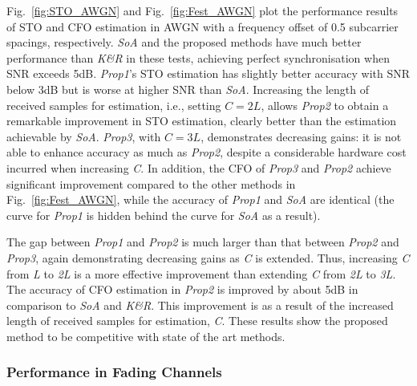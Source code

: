Fig.~\ref{fig:STO_AWGN} and  Fig.~\ref{fig:Fest_AWGN} plot the performance results of STO and CFO estimation in AWGN with a frequency offset of 0.5 subcarrier spacings, respectively.
\textit{SoA} and the proposed methods have much better performance than \textit{K\&R} in these tests, achieving perfect synchronisation when SNR exceeds 5{\thinspace}dB.
\textit{Prop1}'s STO estimation has slightly better accuracy with SNR below 3{\thinspace}dB but is worse at higher SNR than \textit{SoA}.
Increasing the length of received samples for estimation, i.e., setting $C = 2L$, allows \textit{Prop2} to obtain a remarkable improvement in STO estimation, clearly better than the estimation achievable by \textit{SoA}.
\textit{Prop3}, with $C = 3L$, demonstrates decreasing gains: it is not able to enhance accuracy as much as \textit{Prop2}, despite a considerable hardware cost incurred when increasing \emph{C}.
In addition, the CFO of \textit{Prop3} and \textit{Prop2} achieve significant improvement compared to the other methods in Fig.~\ref{fig:Fest_AWGN}, while the accuracy of \textit{Prop1} and \textit{SoA} are identical (the curve for \textit{Prop1} is hidden behind the curve for \textit{SoA} as a result).

The gap between \textit{Prop1} and \textit{Prop2} is much larger than that between \textit{Prop2} and \textit{Prop3}, again demonstrating decreasing gains as \emph{C} is extended. Thus, increasing \emph{C} from \emph{L} to \emph{2L} is a more effective improvement than extending \emph{C} from \emph{2L} to \emph{3L}.
The accuracy of CFO estimation in \textit{Prop2} is improved by about 5{\thinspace}dB in comparison to \textit{SoA} and \textit{K\&R}.
This improvement is as a result of the increased length of received samples for estimation, \textit{C}.
These results show the proposed method to be competitive with state of the art methods.

\subsubsection{Performance in Fading Channels}

